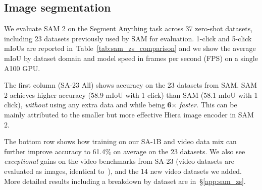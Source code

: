 \documentclass[]{fairmeta}
\newcommand{\x}{{\times}}
\def\x{$\times$}
\newcommand{\secref}[1]{\S\ref{#1}}
\newcommand{\tabref}[1]{Table~\ref{#1}}
\begin{document}
\subsection{Image segmentation}
\label{sec:zero_shot_image_tasks}

We evaluate SAM 2 on the Segment Anything task across 37 zero-shot datasets, including 23 datasets previously used by SAM for evaluation. 1-click and 5-click mIoUs are reported in~\tabref{tab:sam_zs_comparison} and we show the average mIoU by dataset domain and model speed in frames per second (FPS) on a single A100 GPU. 

The first column (SA-23 All) shows accuracy on the 23 datasets from SAM. SAM 2 achieves higher accuracy (58.9 mIoU with 1 click) than SAM (58.1 mIoU with 1 click), \textit{without} using any extra data and while being \textbf{6\x} \textit{faster}. This can be mainly attributed to the smaller but more effective Hiera image encoder in SAM 2.

The bottom row shows how training on our SA-1B and video data mix can further improve accuracy to 61.4\% on average on the 23 datasets. We also see \textit{exceptional} gains on the video benchmarks from SA-23 (video datasets are evaluated as images, identical to~\cite{kirillov2023segment}), and the 14 new video datasets we added.
More detailed results including a breakdown by dataset are in~\secref{app:sam_zs}.
\end{document}
